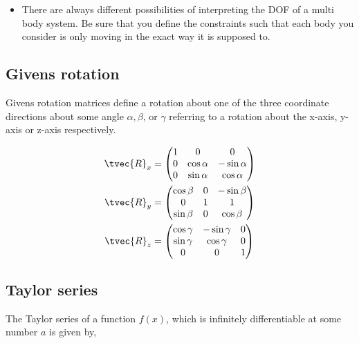 \documentclass[10pt,a4paper]{scrartcl}
\begin{document}
\begin{multicols*}{2}

\begin{itemize}
\item There are always different possibilities of interpreting the DOF of a multi body system. Be sure that you define the constraints such that each body you consider is only moving in the exact way it is supposed to.
\end{itemize}

\subsection{Givens rotation}

Givens rotation matrices define a rotation about one of the three coordinate directions about some angle $\alpha,\beta$, or $\gamma$ referring to a rotation about the x-axis, y-axis or z-axis respectively. 

\begin{equation*}
\begin{aligned}
\tvec{R}_x&=\begin{pmatrix}1&0&0\\0&\cos\alpha&-\sin\alpha\\0&\sin\alpha&\cos\alpha\end{pmatrix}\\
\tvec{R}_y&=\begin{pmatrix}\cos\beta&0&-\sin\beta\\0&1&1\\\sin\beta&0&\cos\beta\end{pmatrix}\\
\tvec{R}_z&=\begin{pmatrix}\cos\gamma&-\sin\gamma&0\\\sin\gamma&\cos\gamma&0\\0&0&1\end{pmatrix}
\end{aligned}
\end{equation*}

\subsection{Taylor series}

The Taylor series of a function $f(x)$, which is infinitely differentiable at some number $a$ is given by,


\end{multicols*}
\end{document}
